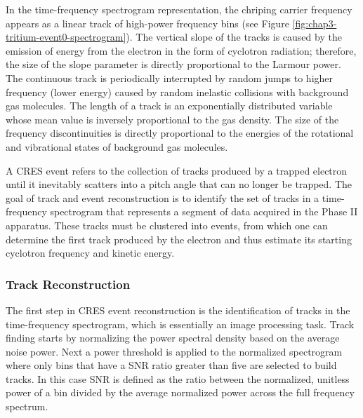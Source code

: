 In the time-frequency spectrogram representation, the chriping carrier frequency appears as a linear track of high-power frequency bins (see Figure \ref{fig:chap3-tritium-event0-spectrogram}). The vertical slope of the tracks is caused by the emission of energy from the electron in the form of cyclotron radiation; therefore, the size of the slope parameter is directly proportional to the Larmour power. The continuous track is periodically interrupted by random jumps to higher frequency (lower energy) caused by random inelastic collisions with background gas molecules. The length of a track is an exponentially distributed variable whose mean value is inversely proportional to the gas density. The size of the frequency discontinuities is directly proportional to the energies of the rotational and vibrational states of background gas molecules. 

A CRES event refers to the collection of tracks produced by a trapped electron until it inevitably scatters into a pitch angle that can no longer be trapped. The goal of track and event reconstruction is to identify the set of tracks in a time-frequency spectrogram that represents a segment of data acquired in the Phase II apparatus. These tracks must be clustered into events, from which one can determine the first track produced by the electron and thus estimate its starting cyclotron frequency and kinetic energy. 

\subsubsection*{Track Reconstruction}

The first step in CRES event reconstruction is the identification of tracks in the time-frequency spectrogram, which is essentially an image processing task. Track finding starts by normalizing the power spectral density based on the average noise power. Next a power threshold is applied to the normalized spectrogram where only bins that have a SNR ratio greater than five are selected to build tracks. In this case SNR is defined as the ratio between the normalized, unitless power of a bin divided by the average normalized power across the full frequency spectrum.

